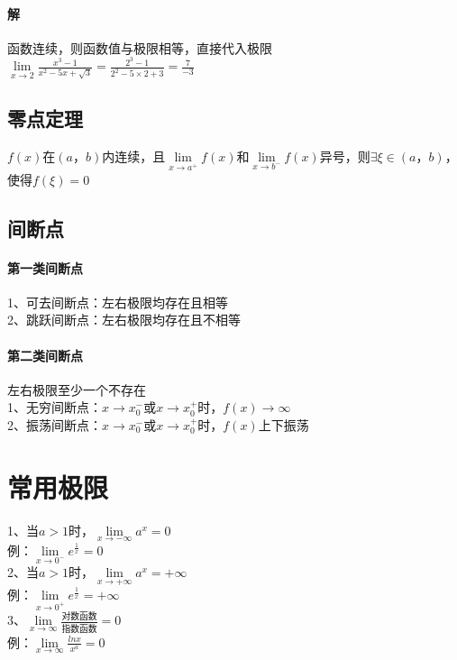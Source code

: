 \documentclass{article}
\begin{document}
\begin{flushleft}
	\paragraph{解}
	函数连续，则函数值与极限相等，直接代入极限\\
	$\lim\limits_{x\to 2}\frac{x^3-1}{x^2-5x+\sqrt3}=\frac{2^3-1}{2^2-5\times2+3}=\frac{7}{-3}$\\
	
	\subsection{零点定理}
	$f(x)$在$(a，b)$内连续，且$\lim\limits_{x\to a^+} f(x)$和$\lim\limits_{x\to b^-} f(x)$异号，则$\exists \xi \in (a，b)$，使得$f(\xi)=0$\\
	
	\subsection{间断点}
	
	\paragraph{第一类间断点}
	1、可去间断点：左右极限均存在且相等\\
	2、跳跃间断点：左右极限均存在且不相等\\
	\paragraph{第二类间断点}
	左右极限至少一个不存在\\
	1、无穷间断点：$x\to x_0^-$或$x\to x_0^+$时，$f(x)\to \infty$\\
	2、振荡间断点：$x\to x_0^-$或$x\to x_0^+$时，$f(x)$上下振荡\\
	
	\section{常用极限}
	
	1、当$a>1$时，$\lim\limits_{x\to-\infty}a^x=0$\\
	\qquad 例：$\lim\limits_{x\to 0^-}e^{\frac{1}{x}}=0$\\
	2、当$a>1$时，$\lim\limits_{x\to+\infty}a^x=+\infty$\\
	\qquad 例：$\lim\limits_{x\to 0^+}e^{\frac{1}{x}}=+\infty$\\
	3、$\lim\limits_{x\to\infty}\frac{\text{对数函数}}{\text{指数函数}}=0$\\
	\qquad 例：$\lim\limits_{x\to\infty}\frac{lnx}{x^a}=0$\\
	

\end{flushleft}
\end{document}
